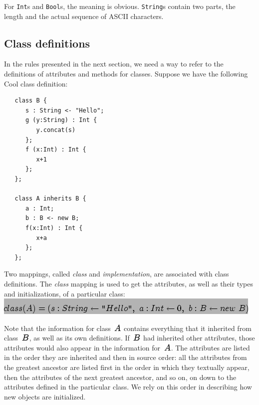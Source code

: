 \documentclass[]{article}
\begin{document}
For \texttt{Int}s and \texttt{Bool}s, the meaning is obvious.
\texttt{String}s contain two parts, the length and the actual sequence
of ASCII characters.

\subsection{Class definitions}

In the rules presented in the next section, we need a way to refer to
the definitions of attributes and methods for classes. Suppose we have
the following Cool class definition:

\begin{verbatim}
   class B {
      s : String <- "Hello";
      g (y:String) : Int {
         y.concat(s)
      };
      f (x:Int) : Int {
         x+1
      };
   };

   class A inherits B {
      a : Int;
      b : B <- new B;
      f(x:Int) : Int {
         x+a
      };
   };
\end{verbatim}

Two mappings, called \emph{class} and \emph{implementation}, are
associated with class definitions. The \emph{class} mapping is used to
get the attributes, as well as their types and initializations, of a
particular class: \\

\includegraphics{img145.png}

Note that the information for class \includegraphics{img45.png} contains
everything that it inherited from class \includegraphics{img146.png}, as
well as its own definitions. If \includegraphics{img146.png} had
inherited other attributes, those attributes would also appear in the
information for \includegraphics{img45.png}. The attributes are listed
in the order they are inherited and then in source order: all the
attributes from the greatest ancestor are listed first in the order in
which they textually appear, then the attributes of the next greatest
ancestor, and so on, on down to the attributes defined in the particular
class. We rely on this order in describing how new objects are
initialized.
\end{document}
